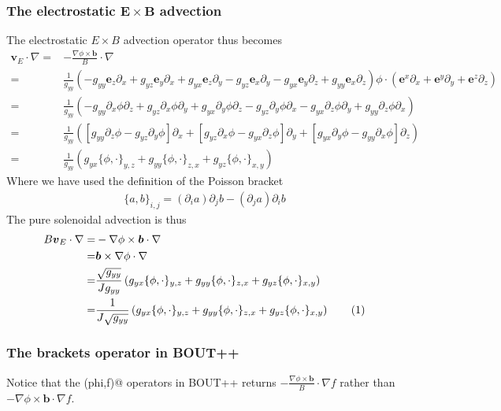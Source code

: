 \documentclass[12pt]{article}
\def\L{\left}
\def\R{\right}
\newcommand{\ve}[1]{\ensuremath{\boldsymbol{#1}}}
\newcommand\numberthis{\addtocounter{equation}{1}\tag{\theequation}}
\begin{document}
\subsubsection{The electrostatic \texorpdfstring{$\ve{E}\times \ve{B}$}{ExB}
%
               advection}
%
The electrostatic $E\times B$ advection operator thus becomes
%
\begin{align*}
    \ve{v}_E\cdot\nabla =& -\frac{\nabla\phi\times\ve{b}}{B}\cdot\nabla\\
    =&\frac{1}{g_{yy}} \L( - g_{yy}\ve{e}_z\partial_x +
    g_{yz}\ve{e}_y\partial_x + g_{yx}\ve{e}_z\partial_y -
    g_{yz}\ve{e}_x\partial_y - g_{yx}\ve{e}_y\partial_z +
    g_{yy}\ve{e}_x\partial_z \R) \phi \cdot\L(\ve{e}^x\partial_x +
    \ve{e}^y\partial_y + \ve{e}^z\partial_z\R)\\
    =& \frac{1}{g_{yy}} \L( - g_{yy}\partial_x\phi\partial_z +
    g_{yz}\partial_x\phi\partial_y + g_{yx}\partial_y\phi\partial_z -
    g_{yz}\partial_y\phi\partial_x - g_{yx}\partial_z\phi\partial_y +
    g_{yy}\partial_z\phi\partial_x \R)\\
    =& \frac{1}{g_{yy}} \L( \L[ g_{yy}\partial_z\phi - g_{yz}\partial_y\phi
\R]\partial_x + \L[ g_{yz}\partial_x\phi - g_{yx}\partial_z\phi \R]\partial_y +
\L[ g_{yx}\partial_y\phi - g_{yy}\partial_x\phi \R]\partial_z \R)\\
    =& \frac{1}{g_{yy}} \L( g_{yx}\{\phi, \cdot\}_{y,z} + g_{yy}\{\phi,
    \cdot\}_{z,x} + g_{yz}\{\phi, \cdot\}_{x,y} \R)
\end{align*}
%
Where we have used the definition of the Poisson bracket
%
\begin{align*}
    \{a, b\}_{i,j} = \L(\partial_i a\R) \partial_j b - \L(\partial_j a\R)
    \partial_i b
\end{align*}
%
The pure solenoidal advection is thus
%
\begin{align*}
    B\ve{v}_E\cdot\nabla =& -\nabla\phi\times\ve{b}\cdot\nabla\\
    =& \ve{b} \times \nabla\phi\cdot\nabla\\
    =& \frac{\sqrt{g_{yy}}}{Jg_{yy}} \L( g_{yx}\{\phi, \cdot\}_{y,z} +
    g_{yy}\{\phi, \cdot\}_{z,x} + g_{yz}\{\phi, \cdot\}_{x,y} \R) \\
    =& \frac{1}{J\sqrt{g_{yy}}} \L( g_{yx}\{\phi, \cdot\}_{y,z} + g_{yy}\{\phi,
\cdot\}_{z,x} + g_{yz}\{\phi, \cdot\}_{x,y} \R) \numberthis
               \label{eq:brackets}
\end{align*}
%


\subsubsection{The brackets operator in BOUT++}
%
Notice that the \verb@brackets(phi,f)@ operators in BOUT++ returns
$-\frac{\nabla\phi\times\ve{b}}{B}\cdot\nabla f$ rather than
$-\nabla\phi\times\ve{b}\cdot\nabla f$.
\end{document}
